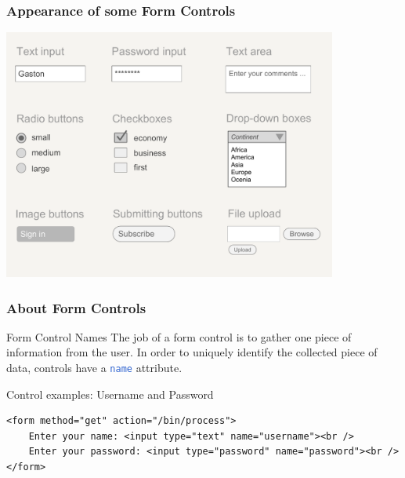 \documentclass{beamer}\usepackage[]{graphicx}\usepackage[]{color}
\newcommand{\highcode}[1]{\textcolor{highlight}{\texttt{#1}}}
\begin{document}

\begin{frame}
\frametitle{Appearance of some Form Controls}

\begin{center}
\includegraphics[width=11cm]{images/html_form_controls.pdf}
\end{center}

\end{frame}


\begin{frame}[fragile]
\frametitle{About Form Controls}

\begin{block}{Form Control Names}
The job of a form control is to gather one piece of information from the user. In order to uniquely identify the collected piece of data, controls have a \highcode{name} attribute.
\end{block}

\begin{block}{Control examples: Username and Password}
{\scriptsize
\begin{verbatim}
<form method="get" action="/bin/process">
    Enter your name: <input type="text" name="username"><br />
    Enter your password: <input type="password" name="password"><br />
</form>
\end{verbatim}
}
\end{block}
\end{frame}

\end{document}
